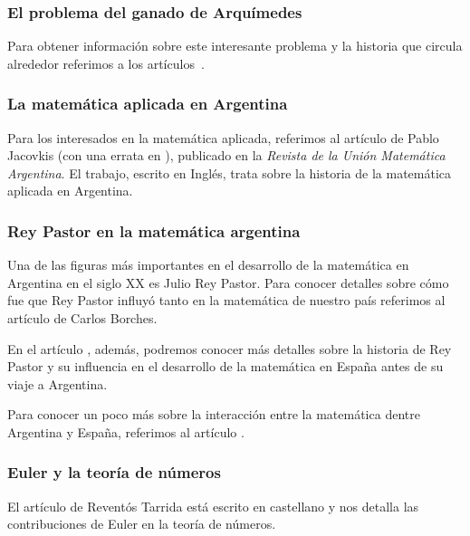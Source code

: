 \subsubsection*{El problema del ganado de Arquímedes}

Para obtener información sobre este interesante problema y la historia
que circula alrededor referimos a
los artículos~\cite{MR1513794,MR1875156,MR1238181,MR1614879,MR1344311}.

\subsubsection*{La matemática aplicada en Argentina}

Para los interesados en la matemática aplicada, referimos al artículo
\cite{MR2504537} 
de Pablo Jacovkis (con una errata en \cite{MR2500178}), publicado
en la \emph{Revista de la Unión Matemática Argentina}. 
El trabajo, escrito en Inglés, 
trata sobre la historia de la matemática aplicada en Argentina.  

\subsubsection*{Rey Pastor en la matemática argentina}

Una de las figuras más importantes en el desarrollo de la matemática
en Argentina en el siglo XX es Julio Rey Pastor. Para conocer
detalles sobre cómo fue que Rey Pastor influyó tanto en la matemática
de nuestro país referimos al artículo 
\cite{THAA4111} de Carlos Borches. 

En el artículo \cite{zbMATH05139177}, además, podremos conocer
más detalles sobre la historia 
de Rey Pastor
y su influencia en el desarrollo de la matemática en España antes de su viaje a 
Argentina. 

Para conocer un poco más sobre la interacción entre la matemática
dentre Argentina y España, referimos al artículo \cite{zbMATH06696384}. 

\subsubsection*{Euler y la teoría de números}

El artículo \cite{zbMATH05763410} de 
Revent{\'o}s Tarrida está escrito en castellano y nos detalla
las contribuciones de Euler en la teoría de números. 


